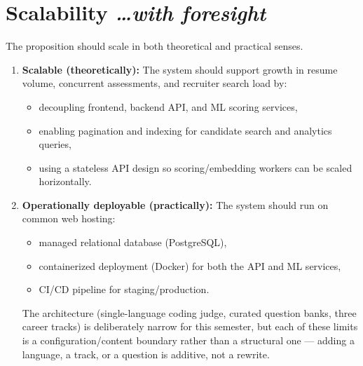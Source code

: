 \documentclass[11pt,a4paper]{article}
\newcommand{\BvrHint}[1]{%
  {\normalfont\normalsize\itshape\hfill #1}}
\begin{document}
\section{Scalability %
\BvrHint{\ldots with foresight}}
The proposition should scale in both theoretical and practical senses.

\begin{enumerate}[leftmargin=0.7cm]
    \item \textbf{Scalable (theoretically):} The system should support growth in resume volume, concurrent assessments, and recruiter search load by:
    \begin{itemize}[leftmargin=0.7cm]
        \item decoupling frontend, backend API, and ML scoring services, 
        \item enabling pagination and indexing for candidate search and analytics queries, 
        \item using a stateless API design so scoring/embedding workers can be scaled horizontally.
    \end{itemize}
    
    \item \textbf{Operationally deployable (practically):} The system should run on common web hosting:
    \begin{itemize}[leftmargin=0.7cm]
        \item managed relational database (PostgreSQL), 
        \item containerized deployment (Docker) for both the API and ML services, 
        \item CI/CD pipeline for staging/production.
    \end{itemize}
   The architecture (single-language coding judge, curated question banks, three career tracks) is deliberately narrow for this semester, but each of these limits is a configuration/content boundary rather than a structural one — adding a language, a track, or a question is additive, not a rewrite. 
   
\end{enumerate}
\end{document}
